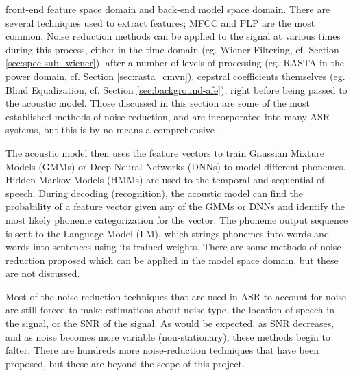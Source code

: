 \DIFdelbegin {}\DIFdelend \DIFaddbegin {}\DIFaddend front-end feature space domain and back-end model space domain.  There are several techniques used to extract features; MFCC and PLP are the most common. Noise reduction methods can be applied to the signal at various times during this process, either in the time domain (eg. Wiener Filtering, cf. Section \ref{sec:spec-sub_wiener}), \DIFdelbegin {}\DIFdelend after a number of levels of processing (eg. RASTA in the power domain, cf. Section \ref{sec:rasta_cmvn}), \DIFdelbegin {}\DIFdelend \DIFaddbegin {}\DIFaddend cepstral coefficients themselves (eg. Blind Equalization, cf. Section \ref{sec:background-afe}), right before being passed to the acoustic model.  Those discussed in this section are some of the most established methods of noise reduction, and are incorporated into many ASR systems, but this is by no means a comprehensive \DIFdelbegin {}\DIFdelend \DIFaddbegin {}\DIFaddend .  

The acoustic model then uses the feature vectors to train Gaussian Mixture Models (GMMs) or Deep Neural Networks (DNNs) to model different phonemes.  Hidden Markov Models (HMMs) are used to \DIFdelbegin {}\DIFdelend \DIFaddbegin {}\DIFaddend the temporal and sequential \DIFdelbegin {}\DIFdelend \DIFaddbegin {}\DIFaddend of speech. During decoding (recognition), the acoustic model can find the probability of a feature vector given any of the GMMs or DNNs \DIFdelbegin \DIFdel{, }\DIFdelend and identify the most likely phoneme categorization for the vector.  The phoneme output sequence is sent to the Language Model (LM), which strings phonemes into words and words into sentences using its trained weights.  There are some methods of noise-reduction proposed which can be applied in the model space domain, but these are not discussed.

Most of the noise-reduction techniques that are used in ASR to account for noise are still forced to make estimations about noise type, the location of speech in the signal, or the SNR of the signal.  As would be expected, as SNR decreases, and as noise becomes more variable (non-stationary), these methods begin to falter.  There are hundreds more noise-reduction techniques that have been proposed, but these are beyond the scope of this project.

